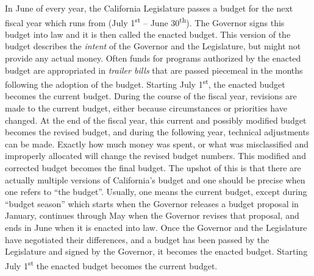 In June of every year, the California Legislature passes a budget for the next fiscal year which runs from (July 1\textsuperscript{st} – June 30\textsuperscript{th}). The Governor signs this budget into law and it is then called the enacted budget. This version of the budget describes the \textit{intent} of the Governor and the Legislature, but might not provide any actual money. Often funds for programs authorized by the enacted budget are appropriated in \textit{trailer bills} that are passed piecemeal in the months following the adoption of the budget. Starting July 1\textsuperscript{st}, the enacted budget becomes the current budget. During the course of the fiscal year, revisions are made to the current budget, either because circumstances or priorities have changed. At the end of the fiscal year, this current and possibly modified budget becomes the revised budget, and during the following year, technical adjustments can be made. Exactly how much money was spent, or what was misclassified and improperly allocated will change the revised budget numbers. This modified and corrected budget becomes the final budget. The upshot of this is that there are actually multiple versions of California's budget and one should be precise when one refers to ``the budget''. Usually, one means the current budget, except during ``budget season'' which starts when the Governor releases a budget proposal in January, continues through May when the Governor revises that proposal, and ends in June when it is enacted into law. Once the Governor and the Legislature have negotiated their differences, and a budget has been passed by the Legislature and signed by the Governor, it becomes the enacted budget. Starting July 1\textsuperscript{st} the enacted budget becomes the current budget.

